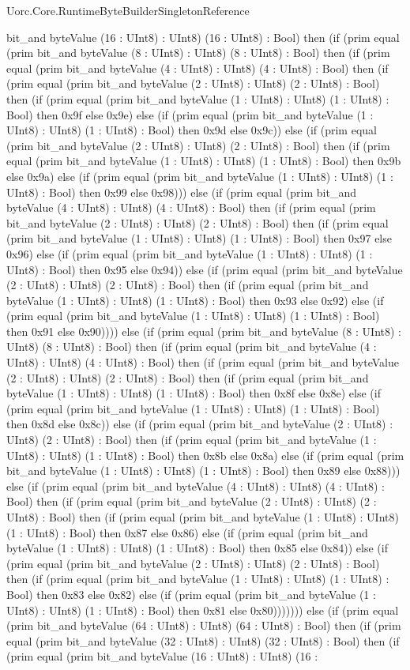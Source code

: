 \begin{lexlean}{Uorc.Core.RuntimeByteBuilderSingletonReference}
\begin{semanticmodule}
{bit_and byteValue (16 : UInt8) : UInt8) (16 : UInt8) : Bool) then (if (prim equal (prim bit_and byteValue (8 : UInt8) : UInt8) (8 : UInt8) : Bool) then (if (prim equal (prim bit_and byteValue (4 : UInt8) : UInt8) (4 : UInt8) : Bool) then (if (prim equal (prim bit_and byteValue (2 : UInt8) : UInt8) (2 : UInt8) : Bool) then (if (prim equal (prim bit_and byteValue (1 : UInt8) : UInt8) (1 : UInt8) : Bool) then 0x9f else 0x9e) else (if (prim equal (prim bit_and byteValue (1 : UInt8) : UInt8) (1 : UInt8) : Bool) then 0x9d else 0x9c)) else (if (prim equal (prim bit_and byteValue (2 : UInt8) : UInt8) (2 : UInt8) : Bool) then (if (prim equal (prim bit_and byteValue (1 : UInt8) : UInt8) (1 : UInt8) : Bool) then 0x9b else 0x9a) else (if (prim equal (prim bit_and byteValue (1 : UInt8) : UInt8) (1 : UInt8) : Bool) then 0x99 else 0x98))) else (if (prim equal (prim bit_and byteValue (4 : UInt8) : UInt8) (4 : UInt8) : Bool) then (if (prim equal (prim bit_and byteValue (2 : UInt8) : UInt8) (2 : UInt8) : Bool) then (if (prim equal (prim bit_and byteValue (1 : UInt8) : UInt8) (1 : UInt8) : Bool) then 0x97 else 0x96) else (if (prim equal (prim bit_and byteValue (1 : UInt8) : UInt8) (1 : UInt8) : Bool) then 0x95 else 0x94)) else (if (prim equal (prim bit_and byteValue (2 : UInt8) : UInt8) (2 : UInt8) : Bool) then (if (prim equal (prim bit_and byteValue (1 : UInt8) : UInt8) (1 : UInt8) : Bool) then 0x93 else 0x92) else (if (prim equal (prim bit_and byteValue (1 : UInt8) : UInt8) (1 : UInt8) : Bool) then 0x91 else 0x90)))) else (if (prim equal (prim bit_and byteValue (8 : UInt8) : UInt8) (8 : UInt8) : Bool) then (if (prim equal (prim bit_and byteValue (4 : UInt8) : UInt8) (4 : UInt8) : Bool) then (if (prim equal (prim bit_and byteValue (2 : UInt8) : UInt8) (2 : UInt8) : Bool) then (if (prim equal (prim bit_and byteValue (1 : UInt8) : UInt8) (1 : UInt8) : Bool) then 0x8f else 0x8e) else (if (prim equal (prim bit_and byteValue (1 : UInt8) : UInt8) (1 : UInt8) : Bool) then 0x8d else 0x8c)) else (if (prim equal (prim bit_and byteValue (2 : UInt8) : UInt8) (2 : UInt8) : Bool) then (if (prim equal (prim bit_and byteValue (1 : UInt8) : UInt8) (1 : UInt8) : Bool) then 0x8b else 0x8a) else (if (prim equal (prim bit_and byteValue (1 : UInt8) : UInt8) (1 : UInt8) : Bool) then 0x89 else 0x88))) else (if (prim equal (prim bit_and byteValue (4 : UInt8) : UInt8) (4 : UInt8) : Bool) then (if (prim equal (prim bit_and byteValue (2 : UInt8) : UInt8) (2 : UInt8) : Bool) then (if (prim equal (prim bit_and byteValue (1 : UInt8) : UInt8) (1 : UInt8) : Bool) then 0x87 else 0x86) else (if (prim equal (prim bit_and byteValue (1 : UInt8) : UInt8) (1 : UInt8) : Bool) then 0x85 else 0x84)) else (if (prim equal (prim bit_and byteValue (2 : UInt8) : UInt8) (2 : UInt8) : Bool) then (if (prim equal (prim bit_and byteValue (1 : UInt8) : UInt8) (1 : UInt8) : Bool) then 0x83 else 0x82) else (if (prim equal (prim bit_and byteValue (1 : UInt8) : UInt8) (1 : UInt8) : Bool) then 0x81 else 0x80))))))) else (if (prim equal (prim bit_and byteValue (64 : UInt8) : UInt8) (64 : UInt8) : Bool) then (if (prim equal (prim bit_and byteValue (32 : UInt8) : UInt8) (32 : UInt8) : Bool) then (if (prim equal (prim bit_and byteValue (16 : UInt8) : UInt8) (16 : }
\end{semanticmodule}
\end{lexlean}
